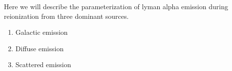 Here we will describe the parameterization of lyman alpha emission during reionization
from three dominant sources.

\begin{enumerate}
\item Galactic emission
\item Diffuse emission
\item Scattered emission
\end{enumerate}
